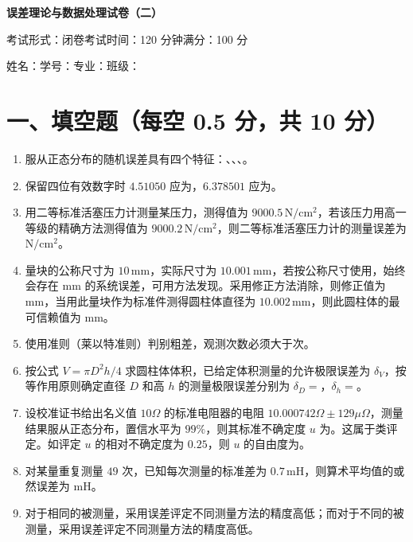 \documentclass[UTF8,12pt,a4paper]{ctexart}
\newcommand{\blank}[1][2.4cm]{\underline{\hspace{#1}}}
\begin{document}
\begin{center}
    {\bfseries 误差理论与数据处理试卷（二）}\par
    \vspace{0.8em}
    考试形式：闭卷\quad 考试时间：120 分钟\quad 满分：100 分
\end{center}
\vspace{0.3em}
\noindent 姓名：\blank[2cm]\quad 学号：\blank[2.5cm]\quad 专业：\blank[2.5cm]\quad 班级：\blank[2cm]
\vspace{0.6em}

\section*{一、填空题（每空 0.5 分，共 10 分）}
\begin{enumerate}[label=\arabic*、]
\item 服从正态分布的随机误差具有四个特征：\blank[1.8cm]、\blank[1.8cm]、\blank[1.8cm]、\blank[1.8cm]。
\item 保留四位有效数字时 $4.51050$ 应为\blank[1.6cm]，$6.378501$ 应为\blank[1.6cm]。
\item 用二等标准活塞压力计测量某压力，测得值为 $9000.5\,\mathrm{N/cm^2}$，若该压力用高一等级的精确方法测得值为 $9000.2\,\mathrm{N/cm^2}$，则二等标准活塞压力计的测量误差为\blank[1.6cm] $\mathrm{N/cm^2}$。
\item 量块的公称尺寸为 $10\,\mathrm{mm}$，实际尺寸为 $10.001\,\mathrm{mm}$，若按公称尺寸使用，始终会存在\blank[1.6cm] $\mathrm{mm}$ 的系统误差，可用\blank[1.8cm]方法发现。采用修正方法消除，则修正值为\blank[1.6cm] $\mathrm{mm}$，当用此量块作为标准件测得圆柱体直径为 $10.002\,\mathrm{mm}$，则此圆柱体的最可信赖值为\blank[1.6cm] $\mathrm{mm}$。
\item 使用\blank[1.3cm]准则（莱以特准则）判别粗差，观测次数必须大于\blank[1cm]次。
\item 按公式 $V=\pi D^2h/4$ 求圆柱体体积，已给定体积测量的允许极限误差为 $\delta_V$，按等作用原则确定直径 $D$ 和高 $h$ 的测量极限误差分别为 $\delta_D=$\blank[2.2cm]，$\delta_h=$\blank[2.2cm]。
\item 设校准证书给出名义值 $10\Omega$ 的标准电阻器的电阻 $10.000742\Omega\pm129\mu\Omega$，测量结果服从正态分布，置信水平为 $99\%$，则其标准不确定度 $u$ 为\blank[1.8cm]。这属于\blank[1cm]类评定。如评定 $u$ 的相对不确定度为 $0.25$，则 $u$ 的自由度为\blank[1cm]。
\item 对某量重复测量 $49$ 次，已知每次测量的标准差为 $0.7\,\mathrm{mH}$，则算术平均值的或然误差为\blank[1.8cm] $\mathrm{mH}$。
\item 对于相同的被测量，采用\blank[1.5cm]误差评定不同测量方法的精度高低；而对于不同的被测量，采用\blank[1.5cm]误差评定不同测量方法的精度高低。
\end{enumerate}
\end{document}
